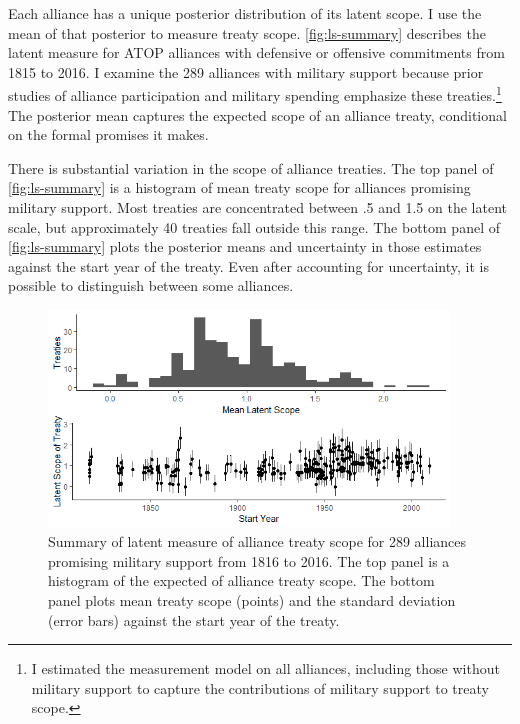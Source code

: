 \documentclass[12pt]{article}
\begin{document}
Each alliance has a unique posterior distribution of its latent scope. 
I use the mean of that posterior to measure treaty scope. 
\autoref{fig:ls-summary} describes the latent measure for ATOP alliances with defensive or offensive commitments from 1815 to 2016.
I examine the 289 alliances with military support because prior studies of alliance participation and military spending emphasize these treaties.\footnote{
I estimated the measurement model on all alliances, including those without military support to capture the contributions of military support to treaty scope.}
The posterior mean captures the expected scope of an alliance treaty, conditional on the formal promises it makes. 


There is substantial variation in the scope of alliance treaties. 
The top panel of \autoref{fig:ls-summary} is a histogram of mean treaty scope for alliances promising military support.  
Most treaties are concentrated between .5 and 1.5 on the latent scale, but approximately 40 treaties fall outside this range. 
The bottom panel of \autoref{fig:ls-summary} plots the posterior means and uncertainty in those estimates against the start year of the treaty. 
Even after accounting for uncertainty, it is possible to distinguish between some alliances. 


\begin{figure}
	\centering
		\includegraphics[width=0.95\textwidth]{../figures/ls-summary.png}
	\caption{Summary of latent measure of alliance treaty scope for 289 alliances promising military support from 1816 to 2016. The top panel is a histogram of the expected of alliance treaty scope. The bottom panel plots mean treaty scope (points) and the standard deviation (error bars) against the start year of the treaty.}
	\label{fig:ls-summary}
\end{figure}
\end{document}

